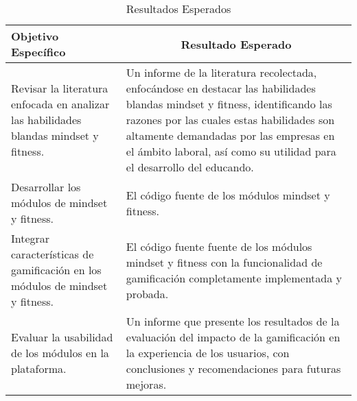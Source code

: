 \begin{table}[H]
    \centering
    \begin{tabularx}{\textwidth}{|X|X|}
        \hline
        \rowcolor{naranja} \centering \textbf{Objetivo Específico} & \multicolumn{1}{|c|}{\textbf{Resultado Esperado}} \\ [1mm] \hline
        Revisar la literatura enfocada en analizar las habilidades blandas mindset y fitness.
        & Un informe de la literatura recolectada, enfocándose en destacar las habilidades blandas mindset y fitness, identificando las razones por las cuales estas habilidades son altamente demandadas por las empresas en el ámbito laboral, así como su utilidad para el desarrollo del educando. \\
        \hline
        Desarrollar los módulos de mindset y fitness.
        & El código fuente de los módulos mindset y fitness. \\
        \hline
        Integrar características de gamificación en los módulos de mindset y fitness.
        & El código fuente  fuente de los módulos mindset y fitness con la funcionalidad de gamificación completamente implementada y probada. \\
        \hline
        Evaluar la usabilidad de los módulos en la plataforma.
        & Un informe que presente los resultados de la evaluación del impacto de la gamificación en la experiencia de los usuarios, con conclusiones y recomendaciones para futuras mejoras. \\
        \hline
    \end{tabularx}
    \caption{Resultados Esperados}
\end{table}

